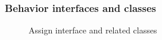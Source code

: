 \subsubsection{Behavior interfaces and classes}
\begin{figure}[htbp]
    \centering
    \tiny
    \begin{tikzpicture}
    
    
    
    
    
    \end{tikzpicture}
    \caption{Assign interface and related classes}
    \label{fig:assigninterface}
\end{figure}


%     
%     
%     

%     
%     
%     

%     
%     
%     

